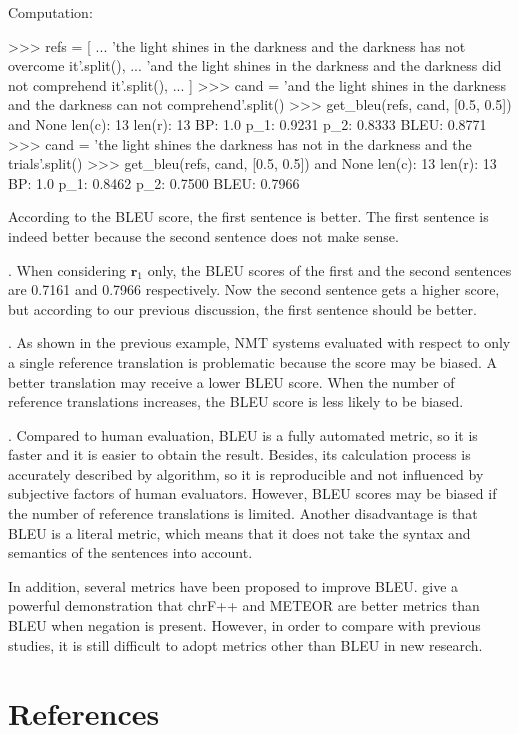 \documentclass[a4paper,12pt]{report}
\newcommand{\rom}[1]{\expandafter{\romannumeral #1\relax}}
\begin{document}
Computation:

\begin{python}
>>> refs = [
...     'the light shines in the darkness and the darkness has not overcome it'.split(),
...     'and the light shines in the darkness and the darkness did not comprehend it'.split(),
... ]
>>> cand = 'and the light shines in the darkness and the darkness can not comprehend'.split()
>>> get_bleu(refs, cand, [0.5, 0.5]) and None
len(c): 13
len(r): 13
BP: 1.0
p_1: 0.9231
p_2: 0.8333
BLEU: 0.8771
>>> cand = 'the light shines the darkness has not in the darkness and the trials'.split()
>>> get_bleu(refs, cand, [0.5, 0.5]) and None
len(c): 13
len(r): 13
BP: 1.0
p_1: 0.8462
p_2: 0.7500
BLEU: 0.7966
\end{python}

According to the BLEU score, the first sentence is better. The first sentence is indeed better because the second sentence does not make sense.

\rom{2}. When considering $\mathbf{r}_1$ only, the BLEU scores of the first and the second sentences are 0.7161 and 0.7966 respectively. Now the second sentence gets a higher score, but according to our previous discussion, the first sentence should be better.

\rom{3}. As shown in the previous example, NMT systems evaluated with respect to only a
single reference translation is problematic because the score may be biased.  A better translation may receive a lower BLEU score. When the number of reference translations increases, the BLEU score is less likely to be biased.

\rom{4}. Compared to human evaluation, BLEU is a fully automated metric, so it is faster and it is easier to obtain the result. Besides, its calculation process is accurately described by algorithm, so it is reproducible and not influenced by subjective factors of human evaluators. However, BLEU scores may be biased if the number of reference translations is limited. Another disadvantage is that BLEU is a literal metric, which means that it does not take the syntax and semantics of the sentences into account.

In addition, several metrics have been proposed to improve BLEU. \citeauthor{bleung} \cite{bleung} give a powerful demonstration that chrF++ and METEOR are better metrics than BLEU when
negation is present. However, in order to compare with previous studies, it is still difficult to adopt metrics other than BLEU in new research.

\newpage

\section*{References}

\printbibliography[heading=none]
\end{document}
